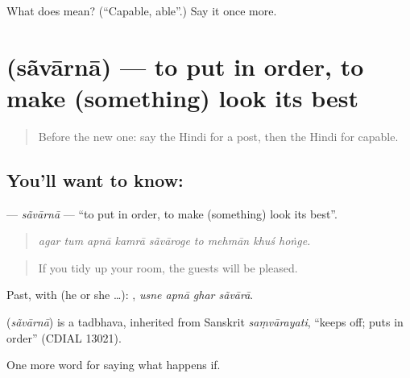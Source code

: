 \begin{tcolorbox}[breakable,colback=teal!4,colframe=teal!35!black,title={Before you move on}]
What does  mean? (\textquotedblleft{}Capable, able\textquotedblright{}.) Say it once more.
\end{tcolorbox}
\section[\texorpdfstring{\hi{सँवारना} (sãvārnā)}{सँवारना (sãvārnā)}]{ (sãvārnā) — to put in order, to make (something) look its best}

\label{lesson:HI-C394-savarna}



\begin{quote}
Before the new one: say the Hindi for a post, then the Hindi for capable.
\end{quote}

\subsection*{You'll want to know: }
\textbf{} — \emph{sãvārnā} — \textquotedblleft{}to put in order, to make (something) look its best\textquotedblright{}.

\begin{quote}
        
\end{quote}

\begin{quote}
\emph{agar tum apnā kamrā sãvāroge to mehmān khuś hoṅge.}
\end{quote}

\begin{quote}
If you tidy up your room, the guests will be pleased.
\end{quote}

Past, with  (he or she …):    , \emph{usne apnā ghar sãvārā}.

\begin{cousinweb}
\textbf{} (\emph{sãvārnā}) is a tadbhava, inherited from Sanskrit \emph{saṃvārayati}, \textquotedblleft{}keeps off; puts in order\textquotedblright{} (CDIAL 13021).
\end{cousinweb}

\begin{grammarlens}[title={What you've built}]
One more word for saying what happens if.
\end{grammarlens}

